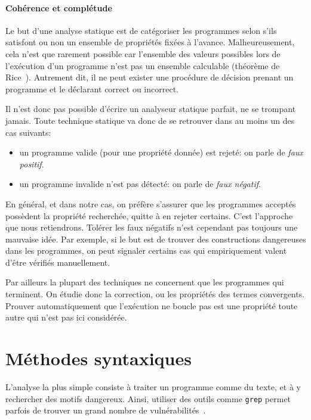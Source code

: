 \paragraph{Cohérence et complétude}

Le but d'une analyse statique est de catégoriser les programmes selon s'ils
satisfont ou non un ensemble de propriétés fixées à l'avance. Malheureusement,
cela n'est que rarement possible car l'ensemble des valeurs possibles lors de
l'exécution d'un programme n'est pas un ensemble calculable (théorème de
Rice~\cite{rice}). Autrement dit, il ne peut exister une procédure de décision
prenant un programme et le déclarant correct ou incorrect.


Il n'est donc pas possible d'écrire un analyseur statique parfait, ne se
trompant jamais. Toute technique statique va donc de se retrouver dans au moins
un des cas suivants:

\begin{itemize}
\item
  un programme valide (pour une propriété donnée) est rejeté: on parle de
  \emph{faux positif}.
\item
  un programme invalide n'est pas détecté: on parle de
  \emph{faux négatif}.
\end{itemize}

En général, et dans notre cas, on préfère s'assurer que les programmes acceptés
possèdent la propriété recherchée, quitte à en rejeter certains. C'est
l'approche que nous retiendrons. Tolérer les faux négatifs n'est cependant pas
toujours une mauvaise idée. Par exemple, si le but est de trouver des
constructions dangereuses dans les programmes, on peut signaler certains cas qui
empiriquement valent d'être vérifiés manuellement.

Par ailleurs la plupart des techniques ne concernent que les programmes qui
terminent. On étudie donc la correction, ou les propriétés des termes
convergents. Prouver automatiquement que l'exécution ne boucle pas est une
propriété toute autre qui n'est pas ici considérée.

\section{Méthodes syntaxiques}

L'analyse la plus simple consiste à traiter un programme comme du texte, et à y
rechercher des motifs dangereux. Ainsi, utiliser des outils comme \texttt{grep}
permet parfois de trouver un grand nombre de vulnérabilités~\cite{SpenderGrep}.

